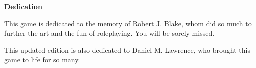 \textbf{\huge Dedication}

This game is dedicated to the memory of Robert J. Blake, whom did so much to further the art and the fun of roleplaying.
You will be sorely missed.

This updated edition is also dedicated to Daniel M. Lawrence, who brought this game to life for so many.